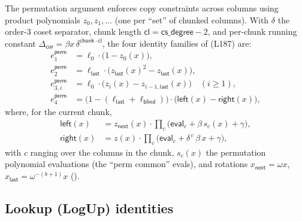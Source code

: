 The permutation argument enforces copy constraints across columns using
product polynomials $z_0, z_1, \ldots$ (one per ``set'' of chunked
columns). With $\delta$ the order-3 coset separator, chunk length
$\mathsf{cl} = \mathsf{cs\_\allowbreak{}degree}-2$, and per-chunk running constant
$\Delta_{\mathsf{cur}} = \beta x\, \delta^{\mathsf{chunk}\cdot \mathsf{cl}}$,
the four identity families of  (L187) are:
\begin{align}
  e^{\mathsf{perm}}_{1} &= \ell_0 \cdot \bigl(1 - z_0(x)\bigr), \label{eq:perm1}\\
  e^{\mathsf{perm}}_{2} &= \ell_{\mathsf{last}} \cdot \bigl(z_{\mathsf{last}}(x)^2 - z_{\mathsf{last}}(x)\bigr), \label{eq:perm2}\\
  e^{\mathsf{perm}}_{3,i} &= \ell_0 \cdot \bigl(z_i(x) - z_{i-1,\mathsf{last}}(x)\bigr)
    \quad (i \geq 1), \label{eq:perm3}\\
  e^{\mathsf{perm}}_{4} &= \bigl(1 - (\ell_{\mathsf{last}} + \ell_{\mathsf{blind}})\bigr)
    \cdot \bigl(\mathsf{left}(x) - \mathsf{right}(x)\bigr), \label{eq:perm4}
\end{align}
where, for the current chunk,
\begin{align}
  \mathsf{left}(x)  &= z_{\mathsf{next}}(x) \cdot \prod_{c}
     \bigl(\mathsf{eval}_c + \beta\, s_c(x) + \gamma\bigr), \label{eq:perm-left}\\
  \mathsf{right}(x) &= z(x) \cdot \prod_{c}
     \bigl(\mathsf{eval}_c + \delta^{\,c}\,\beta\, x + \gamma\bigr),
     \label{eq:perm-right}
\end{align}
with $c$ ranging over the columns in the chunk, $s_c(x)$ the permutation
polynomial evaluations (the ``perm common'' evals), and rotations
$x_{\mathsf{next}} = \omega x$,
$x_{\mathsf{last}} = \omega^{-(b+1)} x$
().

\subsection{Lookup (LogUp) identities}
\label{sec:lookup-ident}

